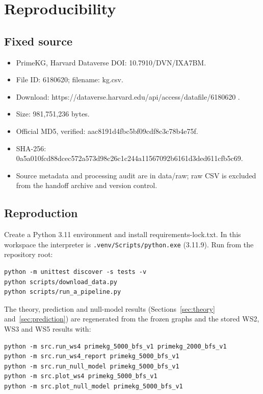 \section{Reproducibility}
\label{app:repro}

\subsection{Fixed source}\label{fixed-source}

\begin{itemize}
\tightlist
\item
  PrimeKG, Harvard Dataverse DOI: 10.7910/DVN/IXA7BM.
\item
  File ID: 6180620; filename: kg.csv.
\item
  Download: https://dataverse.harvard.edu/api/access/datafile/6180620 .
\item
  Size: 981,751,236 bytes.
\item
  Official MD5, verified: aac8191d4fbc5bf09cdf8c3c78b4e75f.
\item
  SHA-256:
  0a5a010fcd88dcec572a573d98c26c1c244a11567092b6161d3ded611cfb5c69.
\item
  Source metadata and processing audit are in data/raw; raw CSV is
  excluded from the handoff archive and version control.
\end{itemize}

\subsection{Reproduction}\label{reproduction}

Create a Python 3.11 environment and install requirements-lock.txt. In
this workspace the interpreter is \texttt{.venv/Scripts/python.exe}
(3.11.9). Run from the repository root:

\begin{verbatim}
python -m unittest discover -s tests -v
python scripts/download_data.py
python scripts/run_a_pipeline.py
\end{verbatim}

The theory, prediction and null-model results (Sections~\ref{sec:theory}
and~\ref{sec:prediction}) are regenerated from the frozen graphs and the stored
WS2, WS3 and WS5 results with:

\begin{verbatim}
python -m src.run_ws4 primekg_5000_bfs_v1 primekg_2000_bfs_v1
python -m src.run_ws4_report primekg_5000_bfs_v1
python -m src.run_null_model primekg_5000_bfs_v1
python -m src.plot_ws4 primekg_5000_bfs_v1
python -m src.plot_null_model primekg_5000_bfs_v1
\end{verbatim}


